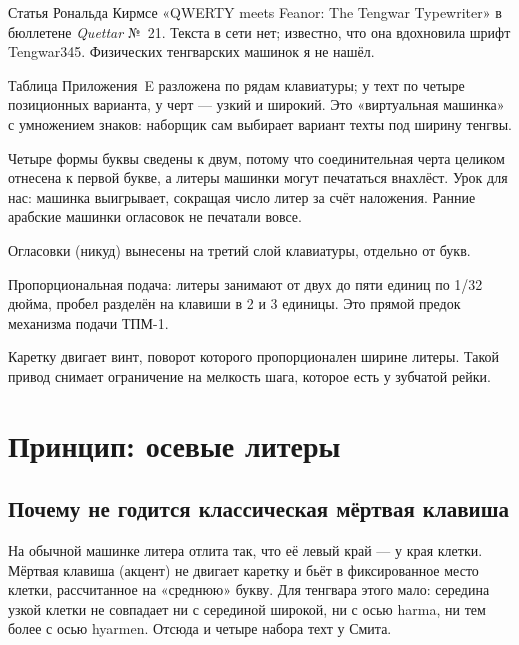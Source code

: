 \documentclass[11pt,a4paper]{article}
\begin{document}
\begin{description}[style=nextline,leftmargin=0pt]
  \item[Тенгварская машинка Кирмсе (1984).] Статья Рональда Кирмсе «QWERTY meets Feanor: The Tengwar Typewriter» в бюллетене \emph{Quettar} №~21. Текста в сети нет; известно, что она вдохновила шрифт Tengwar345. Физических тенгварских машинок я не нашёл.
  \item[Раскладка Дэна Смита (1990-е).] Таблица Приложения~E разложена по рядам клавиатуры; у техт по четыре позиционных варианта, у черт — узкий и широкий. Это «виртуальная машинка» с умножением знаков: наборщик сам выбирает вариант техты под ширину тенгвы.
  \item[Арабская машинка Хаддада (1899).] Четыре формы буквы сведены к двум, потому что соединительная черта целиком отнесена к первой букве, а литеры машинки могут печататься внахлёст. Урок для нас: машинка выигрывает, сокращая число литер за счёт наложения. Ранние арабские машинки огласовок не печатали вовсе.
  \item[Еврейская раскладка.] Огласовки (никуд) вынесены на третий слой клавиатуры, отдельно от букв.
  \item[IBM Executive (1944).] Пропорциональная подача: литеры занимают от двух до пяти единиц по 1/32 дюйма, пробел разделён на клавиши в 2 и 3 единицы. Это прямой предок механизма подачи ТПМ-1.
  \item[Ходовой винт (IBM, 1960-е).] Каретку двигает винт, поворот которого пропорционален ширине литеры. Такой привод снимает ограничение на мелкость шага, которое есть у зубчатой рейки.
\end{description}

\section{Принцип: осевые литеры}

\subsection{Почему не годится классическая мёртвая клавиша}

На обычной машинке литера отлита так, что её левый край — у края клетки. Мёртвая клавиша (акцент) не двигает каретку и бьёт в фиксированное место клетки, рассчитанное на «среднюю» букву. Для тенгвара этого мало: середина узкой клетки не совпадает ни с серединой широкой, ни с осью harma, ни тем более с осью hyarmen. Отсюда и четыре набора техт у Смита.
\end{document}

